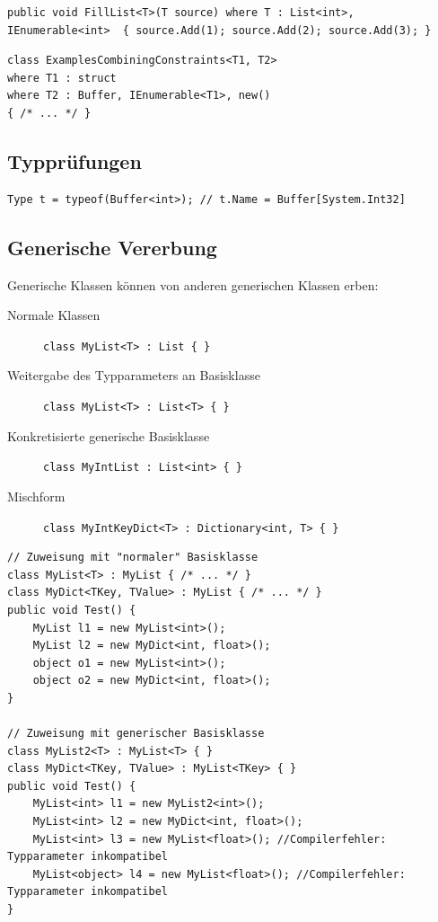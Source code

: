 \documentclass[
a4paper,
oneside,
10pt,
fleqn,
headsepline,
toc=listofnumbered, 
bibliography=totocnumbered]{scrartcl}
\begin{document}
\begin{lstlisting}
public void FillList<T>(T source) where T : List<int>, IEnumerable<int>  { source.Add(1); source.Add(2); source.Add(3); }
\end{lstlisting}


\begin{lstlisting}
class ExamplesCombiningConstraints<T1, T2>
where T1 : struct 
where T2 : Buffer, IEnumerable<T1>, new()
{ /* ... */ } 
\end{lstlisting}

\subsection{Typprüfungen}
\begin{lstlisting}
Type t = typeof(Buffer<int>); // t.Name = Buffer[System.Int32]
\end{lstlisting}

\subsection{Generische Vererbung}
Generische Klassen können von anderen generischen Klassen erben:
\begin{description}
    \item[Normale Klassen] \lstinline|class MyList<T> : List { } |
    \item[Weitergabe des Typparameters an Basisklasse] \lstinline|class MyList<T> : List<T> { } |
    \item [Konkretisierte generische Basisklasse] \lstinline|class MyIntList : List<int> { } |
    \item[Mischform] \lstinline|class MyIntKeyDict<T> : Dictionary<int, T> { } |
\end{description}
\begin{lstlisting}
// Zuweisung mit "normaler" Basisklasse
class MyList<T> : MyList { /* ... */ } 
class MyDict<TKey, TValue> : MyList { /* ... */ } 
public void Test() {
    MyList l1 = new MyList<int>();
    MyList l2 = new MyDict<int, float>();
    object o1 = new MyList<int>();
    object o2 = new MyDict<int, float>(); 
} 

// Zuweisung mit generischer Basisklasse
class MyList2<T> : MyList<T> { } 
class MyDict<TKey, TValue> : MyList<TKey> { }
public void Test() { 
    MyList<int> l1 = new MyList2<int>();
    MyList<int> l2 = new MyDict<int, float>();
    MyList<int> l3 = new MyList<float>(); //Compilerfehler: Typparameter inkompatibel
    MyList<object> l4 = new MyList<float>(); //Compilerfehler: Typparameter inkompatibel
}
\end{lstlisting}
\end{document}
